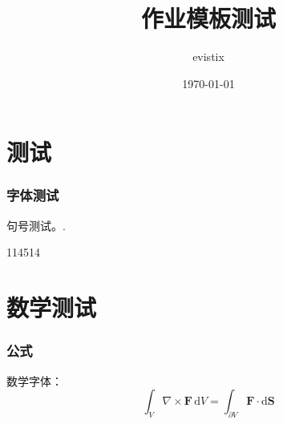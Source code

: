 \documentclass[theme = fancy, zihao = 5]{work-template}
\title{作业模板测试}
\author{evistix}
\date{\today}
\begin{document}
\maketitle

\part{测试}
\section{字体测试}
句号测试。.\par
114514

\part{数学测试}
\section{公式}
数学字体：
\begin{equation}
    \int_V \nabla\times \symbf F\,\mathrm{d}V = \int_{\partial V} \symbf F\cdot\mathrm{d}\symbf S 
\end{equation}
\end{document}
